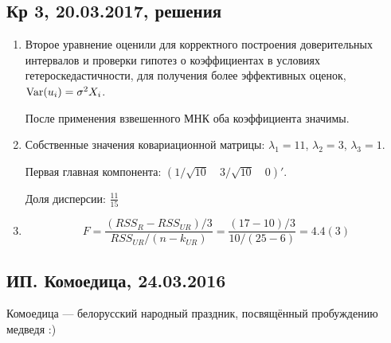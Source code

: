 \documentclass[12pt, a4paper]{article}
\begin{document}
\subsection{Кр 3, 20.03.2017, решения}
\begin{enumerate}
  \item Второе уравнение оценили для корректного построения доверительных интервалов и проверки гипотез о коэффициентах в условиях гетероскедастичности, для получения более эффективных оценок, $\operatorname{Var}(u_i)=\sigma^2 X_i$.

  После применения взвешенного МНК оба коэффициента значимы.
  \item

Собственные значения ковариационной матрицы: $\lambda_1 = 11$, $\lambda_2 = 3$, $\lambda_3 = 1$.

Первая главная компонента: $(1/\sqrt{10} \quad 3/\sqrt{10} \quad 0)'$.

Доля дисперсии: $\frac{11}{15}$

  \item
  \[
  F = \frac{(RSS_R - RSS_{UR})/3}{RSS_{UR}/(n-k_{UR})}= \frac{(17-10)/3}{10/(25-6)} = 4.4(3)
  \]

\end{enumerate}



\subsection{ИП. Комоедица, 24.03.2016}


Комоедица — белорусский народный праздник, посвящённый пробуждению медведя :)
\end{document}
